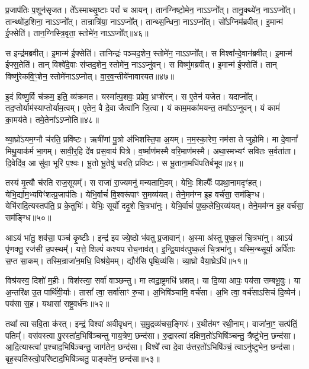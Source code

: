 प्र॒जा\-प॑तिः प॒शून॑\-सृजत।
ते᳚ऽस्माथ्सृ॒ष्टाः परां᳚ च आयन्।
तान॑ग्निष्टो॒मेन॒ नाऽऽप्नो᳚त्।
तानु॒क्थ्ये॑न॒ नाऽऽप्नो᳚त्।
तान्थ्षो॑ड॒शिना॒ नाऽऽप्नो᳚त्।
तान्रात्रि॑या॒ नाऽऽप्नो᳚त्।
तान्थ्स॒न्धिना॒ नाऽऽप्नो᳚त्।
सो᳚ऽग्निम॑ब्रवीत्।
इ॒मान्म॑ ई॒फ्सेति॑।
तान॒ग्निस्त्रि॒वृता॒ स्तोमे॑न॒ नाऽऽप्नो᳚त्॥४६॥\ip

स इन्द्र॑मब्रवीत्।
इ॒मान्म॑ ई॒फ्सेति॑।
तानिन्द्रः॑ पञ्चद॒शेन॒ स्तोमे॑न॒ नाऽऽप्नो᳚त्।
स विश्वा᳚न्दे॒वान॑ब्रवीत्।
इ॒मान्म॑ ईफ्स॒तेति॑।
तान् विश्वे॑दे॒वाः स॑प्तद॒शेन॒ स्तोमे॑न॒ नाऽऽप्नु॑वन्।
स विष्णु॑मब्रवीत्।
इ॒मान्म॑ ई॒फ्सेति॑।
तान् विष्णु॑रेकवि॒ꣳ॒शेन॒ स्तोमे॑नाऽऽप्नोत्।
वा॒र॒व॒न्तीये॑नावारयत॥४७॥\ip

इ॒दं विष्णु॒र्वि च॑क्रम॒ इति॒ व्य॑क्रमत।
यस्मा᳚त्प॒शवः॒ प्रप्रेव॒ भ्रꣳशे॑रन्।
स ए॒तेन॑ यजेत।
यदाप्नो᳚त्।
तद॒प्तोर्याम॑स्याप्तोर्याम॒\-त्वम्।
ए॒तेन॒ वै दे॒वा जैत्वा॑नि जि॒त्वा।
यं काम॒मका॑मयन्त॒ तमा᳚ऽऽप्नुवन्।
यं कामं॑ का॒मय॑ते।
तमे॒तेना᳚ऽऽप्नोति॥४८॥\ip{}

व्या॒घ्रो॑\-ऽयम॒ग्नौ च॑रति॒ प्रवि॑ष्टः।
ऋषी॑णां पु॒त्रो अ॑भिशस्ति॒पा अ॒यम्।
न॒म॒स्का॒रेण॒ नम॑सा ते जुहोमि।
मा दे॒वानां᳚ मिथु॒याक॑र्म भा॒गम्।
सावी॒र्॒हि दे॑व प्रस॒वाय॑ पित्रे।
व॒र्ष्माण॑मस्मै वरि॒माण॑मस्मै।
अथा॒स्मभ्यꣳ॑ सवितः स॒र्वता॑ता।
दि॒वेदि॑व॒ आ सु॑वा॒ भूरि॑ प॒श्वः।
भू॒तो भू॒तेषु॑ चरति॒ प्रवि॑ष्टः।
स भू॒ताना॒मधि॑पतिर्बभूव॥४९॥\ip

तस्य॑ मृ॒त्यौ च॑रति राज॒सूयम्᳚।
स राजा॑ रा॒ज्यमनु॑ मन्यतामि॒दम्।
येभिः॒ शिल्पैः᳚ पप्रथा॒नामदृꣳ॑हत्।
येभि॒र्द्याम॒भ्यपिꣳ॑\-शत्प्र॒जा\-प॑तिः।
येभि॒र्वाचं॑ वि॒श्वरू॑पाꣳ स॒मव्य॑यत्।
तेने॒मम॑ग्न इ॒ह वर्च॑सा॒ सम॑ङ्ग्धि।
येभि॑रादि॒त्यस्तप॑ति॒ प्र के॒तुभिः॑।
येभिः॒ सूर्यो॑ ददृ॒शे चि॒त्रभा॑नुः।
येभि॒र्वाचं॑ पुष्क॒लेभि॒रव्य॑यत्।
तेने॒मम॑ग्न इ॒ह वर्च॑सा॒ सम॑ङ्ग्धि॥५०॥\ip

आऽयं भा॑तु॒ शव॑सा॒ पञ्च॑ कृ॒ष्टीः।
इन्द्र॑ इव ज्ये॒ष्ठो भ॑वतु प्र॒जावान्॑।
अ॒स्मा अ॑स्तु पुष्क॒लं चि॒त्रभा॑नु।
आऽयं पृ॑णक्तु॒ रज॑सी उ॒पस्थम्᳚।
यत्ते॒ शिल्पं॑ कश्यप रोच॒नाव॑त्।
इ॒न्द्रि॒याव॑त्पुष्क॒लं चि॒त्रभा॑नु।
यस्मि॒न्थ्सूर्या॒ अर्पि॑ताः स॒प्त सा॒कम्।
तस्मि॒न्राजा॑न॒मधि॒ विश्र॑ये॒मम्।
द्यौर॑सि पृथि॒व्य॑सि।
व्या॒घ्रो वैया॒घ्रे\-ऽधि॑॥५१॥\ip

विश्र॑यस्व॒ दिशो॑ म॒हीः।
विश॑स्त्वा॒ सर्वा॑ वाञ्छन्तु।
मा त्वद्रा॒ष्ट्रमधि॑ भ्रशत्।
या दि॒व्या आपः॒ पय॑सा सम्बभू॒वुः।
या अ॒न्तरि॑क्ष उ॒त पार्थि॑वी॒र्याः।
तासां᳚ त्वा॒ सर्वा॑साꣳ रु॒चा।
अ॒भिषि॑ञ्चामि॒ वर्च॑सा।
अ॒भि त्वा॒ वर्च॑सा\-ऽसिचं दि॒व्येन॑।
पय॑सा स॒ह।
यथासा॑ राष्ट्र॒वर्ध॑नः॥५२॥\ip

तथा᳚ त्वा सवि॒ता क॑रत्।
इन्द्रं॒ विश्वा॑ अवीवृधन्।
स॒मु॒द्रव्य॑चस॒ङ्गिरः॑।
र॒थीत॑मꣳ रथी॒नाम्।
वाजा॑ना॒ꣳ॒ सत्प॑तिं॒ पतिम्᳚।
वस॑वस्त्वा पु॒रस्ता॑द॒भिषि॑ञ्चन्तु गाय॒त्रेण॒ छन्द॑सा।
रु॒द्रास्त्वा॑ दक्षिण॒तो॑\-ऽभिषि॑ञ्चन्तु॒ त्रैष्टु॑भेन॒ छन्द॑सा।
आ॒दि॒त्यास्त्वा॑ प॒श्चाद॒भिषि॑ञ्चन्तु॒ जाग॑तेन॒ छन्द॑सा।
विश्वे᳚ त्वा दे॒वा उ॑त्तर॒तो॑\-ऽभिषि॑ञ्चं॒ त्वाऽनु॑ष्टुभेन॒ छन्द॑सा। 
बृह॒स्पति॑स्त्वो॒परि॑ष्टाद॒भिषि॑ञ्चतु॒ पाङ्क्ते॑न॒ छन्द॑सा॥५३॥\ip

